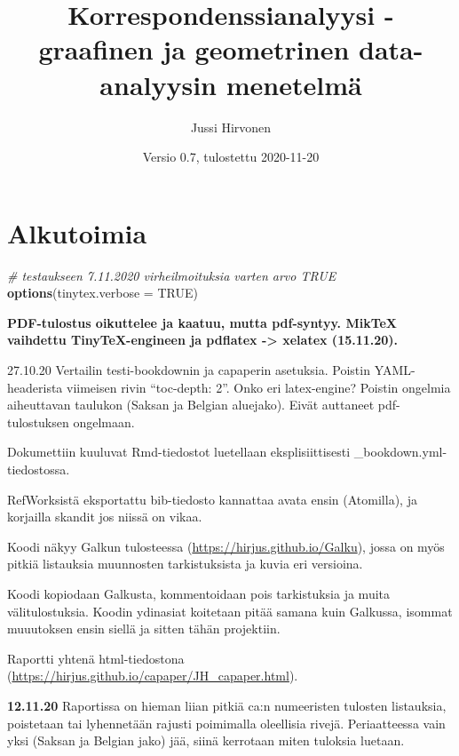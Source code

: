 \documentclass[
  finnish,
]{book}
\title{Korrespondenssianalyysi - graafinen ja geometrinen data-analyysin menetelmä}
\author{Jussi Hirvonen}
\date{Versio 0.7, tulostettu 2020-11-20}
\newenvironment{Shaded}{\begin{snugshade}}{\end{snugshade}}
\newcommand{\CommentTok}[1]{\textcolor[rgb]{0.56,0.35,0.01}{\textit{#1}}}
\newcommand{\DataTypeTok}[1]{\textcolor[rgb]{0.13,0.29,0.53}{#1}}
\newcommand{\KeywordTok}[1]{\textcolor[rgb]{0.13,0.29,0.53}{\textbf{#1}}}
\newcommand{\NormalTok}[1]{#1}
\newcommand{\OtherTok}[1]{\textcolor[rgb]{0.56,0.35,0.01}{#1}}
\begin{document}
\maketitle

{
\setcounter{tocdepth}{1}
\tableofcontents
}
\hypertarget{alkutoimia}{%
\chapter*{Alkutoimia}\label{alkutoimia}}

\begin{Shaded}
\begin{Highlighting}[]
\CommentTok{# testaukseen 7.11.2020 virheilmoituksia varten arvo TRUE}
\KeywordTok{options}\NormalTok{(}\DataTypeTok{tinytex.verbose =} \OtherTok{TRUE}\NormalTok{)}
\end{Highlighting}
\end{Shaded}

\textbf{PDF-tulostus oikuttelee ja kaatuu, mutta pdf-syntyy. MikTeX vaihdettu TinyTeX-engineen ja pdflatex -\textgreater{} xelatex (15.11.20).}

27.10.20 Vertailin testi-bookdownin ja capaperin asetuksia.
Poistin YAML-headerista viimeisen rivin ``toc-depth: 2''. Onko eri latex-engine?
Poistin ongelmia aiheuttavan taulukon (Saksan ja Belgian aluejako).
Eivät auttaneet pdf-tulostuksen ongelmaan.

Dokumettiin kuuluvat Rmd-tiedostot luetellaan eksplisiittisesti
\_bookdown.yml-tiedostossa.

RefWorksistä eksportattu bib-tiedosto kannattaa avata ensin (Atomilla),
ja korjailla skandit jos niissä on vikaa.

Koodi näkyy Galkun tulosteessa (\url{https://hirjus.github.io/Galku}), jossa on myös
pitkiä listauksia muunnosten tarkistuksista ja kuvia eri versioina.

Koodi kopiodaan Galkusta, kommentoidaan pois tarkistuksia ja muita välitulostuksia.
Koodin ydinasiat koitetaan pitää samana kuin Galkussa, isommat muuutoksen ensin siellä
ja sitten tähän projektiin.

Raportti yhtenä html-tiedostona (\url{https://hirjus.github.io/capaper/JH_capaper.html}).

\textbf{12.11.20}
Raportissa on hieman liian pitkiä ca:n numeeristen tulosten listauksia, poistetaan tai
lyhennetään rajusti poimimalla oleellisia rivejä. Periaatteessa vain yksi (Saksan ja Belgian jako)
jää, siinä kerrotaan miten tuloksia luetaan.
\end{document}
